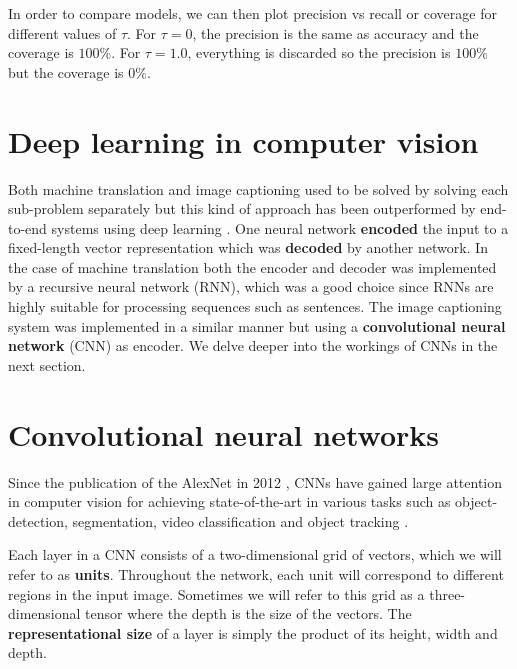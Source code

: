 In order to compare models, we can then plot precision vs recall or coverage for different values of $\tau$. For $\tau=0$, the precision is the same as accuracy and the coverage is $100\%$. For $\tau=1.0$, everything is discarded so the precision is $100\%$ but the coverage is $0\%$.

\section{Deep learning in computer vision}

Both machine translation and image captioning used to be solved by solving each sub-problem separately but this kind of approach has been outperformed by end-to-end systems using deep learning \cite{machine_translation_attention, ShowAndTell}. One neural network \textbf{encoded} the input to a fixed-length vector representation which was \textbf{decoded} by another network. In the case of machine translation both the encoder and decoder was implemented by a recursive neural network (RNN), which was a good choice since RNNs are highly suitable for processing sequences such as sentences. The image captioning system was implemented in a similar manner but using a \textbf{convolutional neural network} (CNN) as encoder. We delve deeper into the workings of CNNs in the next section.


\section{Convolutional neural networks}

Since the publication of the AlexNet in 2012 \cite{AlexNet}, CNNs have gained large attention in computer vision for achieving state-of-the-art in various tasks such as object-detection, segmentation, video classification and object tracking \cite{InceptionV3}.


Each layer in a CNN consists of a two-dimensional grid of vectors, which we will refer to as \textbf{units}. Throughout the network, each unit will correspond to different regions in the input image. Sometimes we will refer to this grid as a three-dimensional tensor where the depth is the size of the vectors. The \textbf{representational size} of a layer is simply the product of its height, width and depth.


